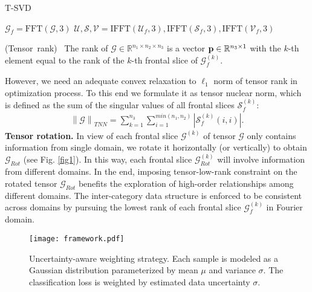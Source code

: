 \documentclass[10pt,twocolumn,letterpaper]{article}
\begin{document}
\begin{algorithm}[!t]
	\caption{T-SVD}\label{alg1}
	${\mathcal{G}_f} = \text{FFT}(\mathcal{G}, 3)$\;
	$\mathcal{U}, \mathcal{S}, \mathcal{V} = \text{IFFT}(\mathcal{U}_f, 3), \text{IFFT}(\mathcal{S}_f,3), \text{IFFT}(\mathcal{V}_f,3)$ \;
\end{algorithm}

\begin{definition}
	(Tensor~rank)~\cite{kilmer2013third,lu2019tensor} The rank of $\mathcal{G}\in {\mathbb{R}}^{n_1\times n_2 \times n_3}$ is a vector ${\bf{p}}\in\mathbb{R}^{n_3\times1}$ with the $k$-th element equal to the rank of the $k$-th frontal slice of $\mathcal{G}_f^{(k)}$. 
\end{definition}

However, we need an adequate convex relaxation to $\ell_1$ norm of tensor rank in optimization process. To this end we formulate it as tensor nuclear norm, which is defined as the sum of the singular values of all frontal slices $\mathcal{S}_f^{(k)}$:
\begin{align}
	\left \| \mathcal{G} \right \|_{TNN} = \sum_{k=1}^{n_3}\sum_{i=1}^{min(n_1,n_2)}|\mathcal{S}_f^{(k)}(i,i)|. 
\end{align}
\textbf{Tensor rotation.} In view of each frontal slice $\mathcal{G}^{(k)}$ of tensor $\mathcal{G}$ only contains information from single domain, we rotate it horizontally (or vertically) to obtain ${\mathcal{G}}_{Rot}$ (see Fig. \ref{fig1}). In this way, each frontal slice ${\mathcal{G}}_{Rot}^{(k)}$ will involve information from different domains. In the end, imposing tensor-low-rank constraint on the rotated tensor ${\mathcal{G}}_{Rot}$ benefits the exploration of high-order relationships among different domains. The inter-category data structure is enforced to be consistent across domains by pursuing the lowest rank of each frontal slice ${\mathcal{G}}_f^{(k)}$ in Fourier domain.
\begin{figure}
	\centering
	\texttt{[image: framework.pdf]}\\
	\caption{Uncertainty-aware weighting strategy. Each sample is modeled as a Gaussian distribution parameterized by mean $\mu$ and variance $\sigma$. The classification loss is weighted by estimated data uncertainty $\sigma$.}
	\label{fig2}
\vspace{-1em}
\end{figure}
\end{document}

